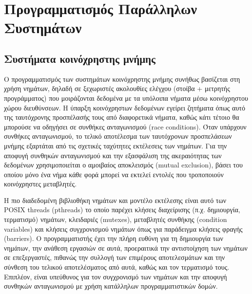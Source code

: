 \section{Προγραμματισμός Παράλληλων Συστημάτων}

\subsection{Συστήματα κοινόχρηστης μνήμης}
\label{ssec:Shared Memory Programming}
Ο προγραμματισμός των συστημάτων κοινόχρηστης μνήμης συνήθως βασίζεται στη χρήση νημάτων, δηλαδή σε ξεχωριστές ακολουθίες ελέγχου (στοίβα + μετρητής προγράμματος) που μοιράζονται δεδομένα με τα υπόλοιπα  νήματα μέσω κοινόχρηστου χώρου διευθύνσεων. Η ύπαρξη κοινόχρηστων δεδομένων εγείρει ζητήματα όπως αυτό της ταυτόχρονης προσπέλασής τους από διαφορετικά νήματα, καθώς κάτι τέτοιο θα μπορούσε να οδηγήσει σε συνθήκες ανταγωνισμού (race conditions). Όταν υπάρχουν συνθήκες ανταγωνισμού, το τελικό αποτέλεσμα των ταυτόχρονων προσπελάσεων μνήμης εξαρτάται από τις σχετικές ταχύτητες εκτέλεσεις των νημάτων. Για την αποφυγή συνθηκών ανταγωνισμού και την εξασφάλιση της ακεραιότητας των δεδομένων χρησιμοποιείται ο αμοιβαίος αποκλεισμός (mutual exclusion), βάσει του οποίου μόνο ένα νήμα κάθε φορά μπορεί να εκτελεί εντολές που τροποποιούν κοινόχρηστες μεταβλητές.

Η πιο διαδεδομένη βιβλιοθήκη νημάτων και μοντέλο εκτέλεσης είναι αυτό των POSIX threads (pthreads) το οποίο παρέχει κλήσεις διαχείρισης (π.χ. δημιουργία, τερματισμό) νημάτων, κλειδαριές (mutexes), μεταβλητές συνθήκης (condition variables) και κλήσεις συγχρονισμού νημάτων όπως για παράδειγμα κλήσεις φραγής (barriers). Ο προγραμματιστής έχει την πλήρη ευθύνη για τη δημιουργία των νημάτων, την ανάθεση εργασιών σε αυτά, προεραιτικά την αντιστοίχηση των νημάτων σε επεξεργαστές, πιθανώς την συλλογή των επιμέρους αποτελεσμάτων και την σύνθεση του τελικού αποτελέσματος από αυτά, καθώς και τον τερματισμό τους. Επιπλέον, είναι υπεύθυνος για τον συγχρονισμό των νημάτων και την αποφυγή συνθηκών ανταγωνισμού με χρήση κατάλληλων προγραμματιστικών δομών.

